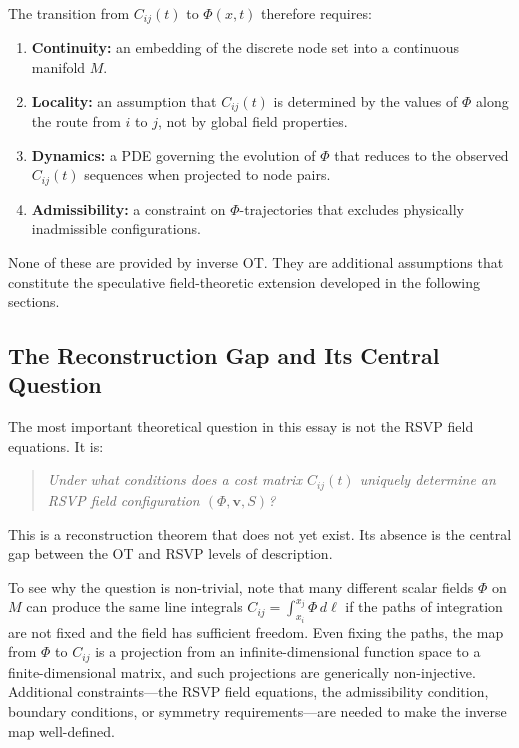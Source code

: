 \documentclass[12pt]{article}
\begin{document}
The transition from $C_{ij}(t)$ to $\Phi(x,t)$ therefore requires:
\begin{enumerate}[leftmargin=2em]
\item \textbf{Continuity:} an embedding of the discrete node set into a continuous manifold $M$.
\item \textbf{Locality:} an assumption that $C_{ij}(t)$ is determined by the values of $\Phi$ along the route from $i$ to $j$, not by global field properties.
\item \textbf{Dynamics:} a PDE governing the evolution of $\Phi$ that reduces to the observed $C_{ij}(t)$ sequences when projected to node pairs.
\item \textbf{Admissibility:} a constraint on $\Phi$-trajectories that excludes physically inadmissible configurations.
\end{enumerate}

None of these are provided by inverse OT. They are additional assumptions that constitute the speculative field-theoretic extension developed in the following sections.

\subsection{The Reconstruction Gap and Its Central Question}

The most important theoretical question in this essay is not the RSVP field equations. It is:

\begin{quote}
\itshape Under what conditions does a cost matrix $C_{ij}(t)$ uniquely determine an RSVP field configuration $(\Phi, \mathbf{v}, S)$?
\end{quote}

This is a reconstruction theorem that does not yet exist. Its absence is the central gap between the OT and RSVP levels of description.

To see why the question is non-trivial, note that many different scalar fields $\Phi$ on $M$ can produce the same line integrals $C_{ij} = \int_{x_i}^{x_j} \Phi\, d\ell$ if the paths of integration are not fixed and the field has sufficient freedom. Even fixing the paths, the map from $\Phi$ to $C_{ij}$ is a projection from an infinite-dimensional function space to a finite-dimensional matrix, and such projections are generically non-injective. Additional constraints---the RSVP field equations, the admissibility condition, boundary conditions, or symmetry requirements---are needed to make the inverse map well-defined.
\end{document}
